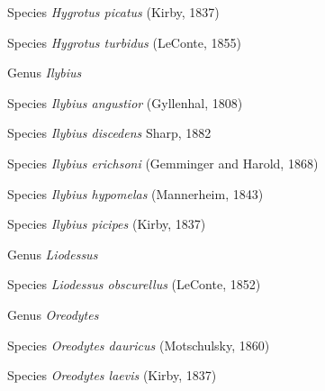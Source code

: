 \documentclass[9pt, article]{memoir}
\begin{document}
\begin{multicols}{2}
\vspace{6pt}\noindent\hspace{36pt}Species \textit{Hygrotus picatus} (Kirby, 1837)


\vspace{6pt}\noindent\hspace{36pt}Species \textit{Hygrotus turbidus} (LeConte, 1855)


\vspace{6pt}\noindent\hspace{30pt}Genus \textit{Ilybius}


\vspace{6pt}\noindent\hspace{36pt}Species \textit{Ilybius angustior} (Gyllenhal, 1808)


\vspace{6pt}\noindent\hspace{36pt}Species \textit{Ilybius discedens} Sharp, 1882


\vspace{6pt}\noindent\hspace{36pt}Species \textit{Ilybius erichsoni} (Gemminger and Harold, 1868)


\vspace{6pt}\noindent\hspace{36pt}Species \textit{Ilybius hypomelas} (Mannerheim, 1843)


\vspace{6pt}\noindent\hspace{36pt}Species \textit{Ilybius picipes} (Kirby, 1837)


\vspace{6pt}\noindent\hspace{30pt}Genus \textit{Liodessus}


\vspace{6pt}\noindent\hspace{36pt}Species \textit{Liodessus obscurellus} (LeConte, 1852)


\vspace{6pt}\noindent\hspace{30pt}Genus \textit{Oreodytes}


\vspace{6pt}\noindent\hspace{36pt}Species \textit{Oreodytes dauricus} (Motschulsky, 1860)


\vspace{6pt}\noindent\hspace{36pt}Species \textit{Oreodytes laevis} (Kirby, 1837)



\end{multicols}
\end{document}
